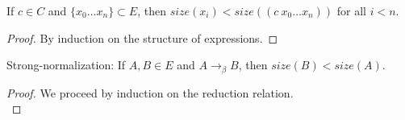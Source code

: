 \documentclass{lmcs}
\newcommand{\arr}{\rightarrow}
\newcommand{\barr}{\arr_{\beta}}
\begin{document}
\begin{lem}\label{lem:pointsize}
  If \(c \in C\) and \(\{x_0 \ldots x_n\} \subset E\), then \(size(x_i) < size((c\ x_0 \ldots x_n))\) for all \(i < n\).
\end{lem}

\begin{proof}
  By induction on the structure of expressions.
\end{proof}

\begin{thm}\label{thm:sn}
  Strong-normalization: If \(A, B \in E\) and \(A \barr B\), then \(size(B) < size(A)\).
\end{thm}

\begin{proof}
  We proceed by induction on the reduction relation.\\


\end{proof}
\end{document}
